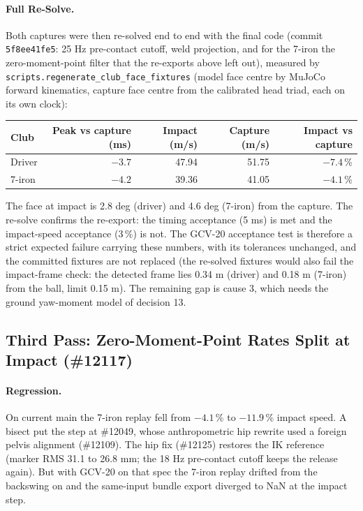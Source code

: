 \documentclass[11pt,a4paper]{article}
\begin{document}
\paragraph{Full Re-Solve.} Both captures were then re-solved end to end with
the final code (commit \texttt{5f8ee41fe5}: 25 Hz pre-contact cutoff, weld
projection, and for the 7-iron the zero-moment-point filter that the
re-exports above left out), measured by
\texttt{scripts.regenerate\_club\_face\_fixtures} (model face centre by MuJoCo
forward kinematics, capture face centre from the calibrated head triad, each
on its own clock):
\begin{center}
\begin{tabular}{@{}lrrrr@{}}
\toprule
Club & Peak vs capture (ms) & Impact (m/s) & Capture (m/s) & Impact vs capture \\
\midrule
Driver & $-3.7$ & 47.94 & 51.75 & $-7.4$\,\% \\
7-iron & $-4.2$ & 39.36 & 41.05 & $-4.1$\,\% \\
\bottomrule
\end{tabular}
\end{center}
The face at impact is 2.8 deg (driver) and 4.6 deg (7-iron) from the
capture. The re-solve confirms the re-export: the timing acceptance (5 ms)
is met and the impact-speed acceptance (3\,\%) is not. The GCV-20 acceptance
test is therefore a strict expected failure carrying these numbers, with its
tolerances unchanged, and the committed fixtures are not replaced (the
re-solved fixtures would also fail the impact-frame check: the detected frame
lies 0.34 m (driver) and 0.18 m (7-iron) from the ball, limit 0.15 m). The
remaining gap is cause 3, which needs the ground yaw-moment model of
decision 13.

\subsection{Third Pass: Zero-Moment-Point Rates Split at Impact (\#12117)}
\label{sec:gcv20_zmp_split}
\paragraph{Regression.} On current main the 7-iron replay fell from
$-4.1$\,\% to $-11.9$\,\% impact speed. A bisect put the step at \#12049,
whose anthropometric hip rewrite used a foreign pelvis alignment (\#12109).
The hip fix (\#12125) restores the IK reference (marker RMS 31.1 to
26.8 mm; the 18 Hz pre-contact cutoff keeps the release again). But with
GCV-20 on that spec the 7-iron replay drifted from the backswing on and the
same-input bundle export diverged to NaN at the impact step.
\end{document}
